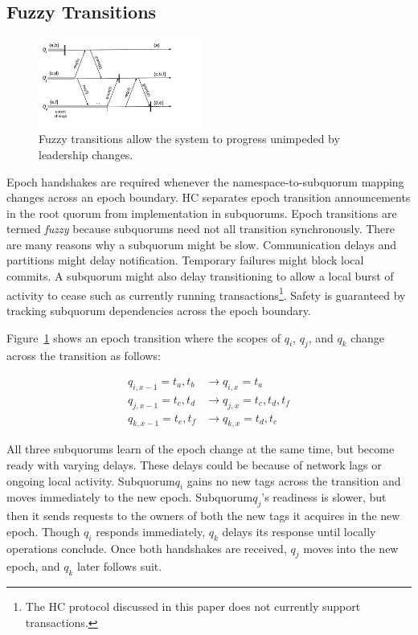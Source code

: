 \documentclass[10pt,conference]{IEEEtran}
\newcommand{\sub}{subquorum\xspace}
\newcommand{\Sub}{Subquorum\xspace}
\newcommand{\subs}{subquorums\xspace}
\newcommand{\roo}{root quorum\xspace}
\begin{document}
\subsection{Fuzzy Transitions}
\label{section:fuzzy}

\begin{figure}
    \centering
    \includegraphics[width=0.48\textwidth]{figures/namespaceHandoff}
    \caption{Fuzzy transitions allow the system to progress unimpeded by
    leadership changes.}
    \label{fig:handoff}
\end{figure}

Epoch handshakes are required whenever the namespace-to-\sub mapping changes across an
epoch boundary.
HC separates epoch transition announcements in the
\roo from implementation in \subs.
Epoch transitions are termed \emph{fuzzy} because
\subs need not all transition synchronously.
There are many reasons why a \sub might be slow.
Communication delays and partitions might delay notification.
Temporary failures might block local commits.
A \sub might also delay transitioning to allow a local burst of activity to
cease such as currently running transactions\footnote{The HC protocol
discussed in this paper does not currently support transactions.}.
Safety is guaranteed by tracking \sub dependencies across the epoch boundary.



Figure~\ref{fig:handoff} shows an epoch transition where the scopes of
$q_i$, $q_j$, and $q_k$ change across the transition as follows:

\begin{align*}
  \label{eq:3}
  q_{i,x-1} = t_a, t_b  &\longrightarrow q_{i,x} = t_a\\
  q_{j,x-1} = t_c, t_d  &\longrightarrow q_{j,x} = t_c,t_d,t_f\\
  q_{k,x-1} = t_e, t_f  &\longrightarrow q_{k,x} = t_d,t_e
\end{align*}

All three \subs learn of the epoch change at the same time, but become ready
with varying delays.
These delays could be because of network lags or ongoing local activity.
\Sub $q_i$ gains no new tags across the transition and moves immediately to the new epoch.
\Sub $q_j$'s readiness is slower, but then it sends requests to the
owners of both the new tags it acquires in the new epoch.
Though $q_i$ responds immediately, $q_k$ delays its response until locally
operations conclude.
Once both handshakes are received, $q_j$ moves into the new epoch, and $q_k$
later follows suit.
\end{document}

